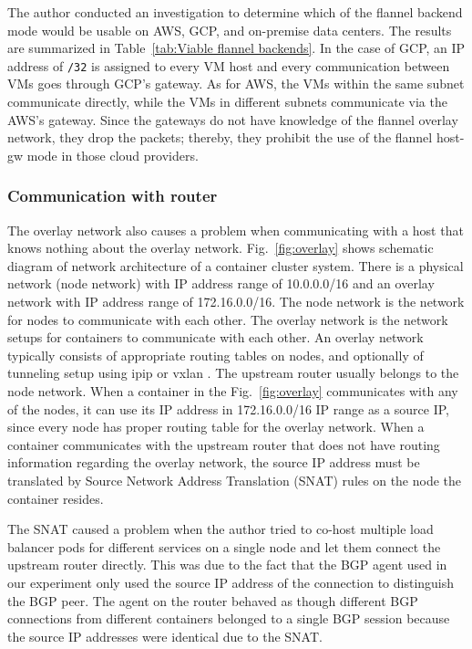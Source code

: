 The author conducted an investigation to determine which of the flannel backend mode would be usable on AWS, GCP, and on-premise data centers.
The results are summarized in Table~\ref{tab:Viable flannel backends}. 
In the case of GCP, an IP address of {\tt /32} is assigned to every VM host and 
every communication between VMs goes through GCP's gateway.
As for AWS, the VMs within the same subnet communicate directly, while the VMs in different subnets communicate via the AWS's gateway.
Since the gateways do not have knowledge of the flannel overlay network, they drop the packets; thereby, 
they prohibit the use of the flannel host-gw mode in those cloud providers.  

\subsubsection{Communication with router}

The overlay network also causes a problem when communicating with a host that knows nothing about the overlay network.
Fig.~\ref{fig:overlay} shows schematic diagram of network architecture of a container cluster system. 
There is a physical network (node network) with IP address range of 10.0.0.0/16 and an overlay network with IP address range of 172.16.0.0/16.
The node network is the network for nodes to communicate with each other.
The overlay network is the network setups for containers to communicate with each other.
An overlay network typically consists of appropriate routing tables on nodes, and optionally of tunneling setup using ipip \cite{kuznetsov1999tunnels} or vxlan \cite{zismer2016performance}.
The upstream router usually belongs to the node network.
When a container in the Fig.~\ref{fig:overlay} communicates with any of the nodes, it can use its IP address in 172.16.0.0/16 IP range as a source IP, since every node has proper routing table for the overlay network.
When a container communicates with the upstream router that does not have routing information regarding the overlay network, the source IP address must be translated by Source Network Address Translation (SNAT) rules on the node the container resides.

The SNAT caused a problem when the author tried to co-host multiple load balancer pods for different services on a single node and let them connect the upstream router directly.
This was due to the fact that the BGP agent used in our experiment only used the source IP address of the connection to distinguish the BGP peer.
The agent on the router behaved as though different BGP connections from different containers belonged to a single BGP session because the source IP addresses were identical due to the SNAT.

